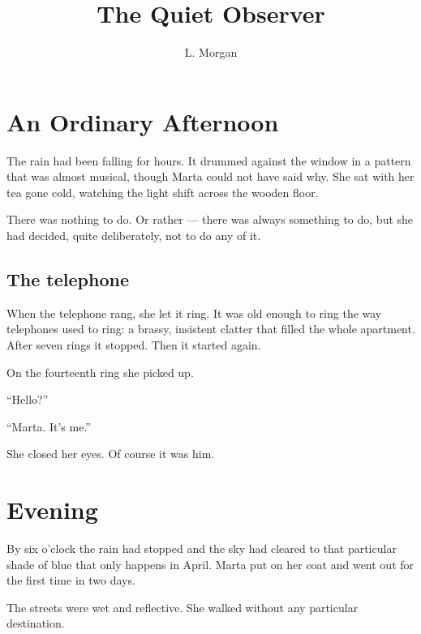 \documentclass[12pt]{memoir}
\title{The Quiet Observer}
\author{L. Morgan}
\begin{document}
\maketitle
\tableofcontents

\chapter{An Ordinary Afternoon}

The rain had been falling for hours. It drummed against the window in a pattern that was almost musical, though Marta could not have said why. She sat with her tea gone cold, watching the light shift across the wooden floor.

There was nothing to do. Or rather — there was always something to do, but she had decided, quite deliberately, not to do any of it.

\section*{The telephone}

When the telephone rang, she let it ring. It was old enough to ring the way telephones used to ring: a brassy, insistent clatter that filled the whole apartment. After seven rings it stopped. Then it started again.

On the fourteenth ring she picked up.

``Hello?''

``Marta. It's me.''

She closed her eyes. Of course it was him.

\chapter{Evening}

By six o'clock the rain had stopped and the sky had cleared to that particular shade of blue that only happens in April. Marta put on her coat and went out for the first time in two days.

The streets were wet and reflective. She walked without any particular destination.
\end{document}
